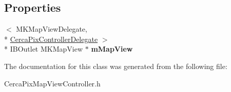 \subsection*{Properties}
\begin{DoxyCompactItemize}
\item 
\hypertarget{interface_cerca_pix_map_view_controller_a08601c76cf889d311a2033f2741784a4}{$<$ M\-K\-Map\-View\-Delegate, \\*
\hyperlink{protocol_cerca_pix_controller_delegate-p}{Cerca\-Pix\-Controller\-Delegate} $>$\\*
 I\-B\-Outlet M\-K\-Map\-View $\ast$ {\bfseries m\-Map\-View}}\label{interface_cerca_pix_map_view_controller_a08601c76cf889d311a2033f2741784a4}

\end{DoxyCompactItemize}


The documentation for this class was generated from the following file\-:\begin{DoxyCompactItemize}
\item 
Cerca\-Pix\-Map\-View\-Controller.\-h\end{DoxyCompactItemize}
